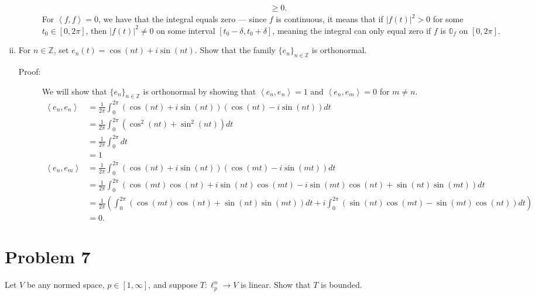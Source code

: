 \documentclass[8pt]{extarticle}
\newcommand{\Z}{\mathbb{Z}}
\newcommand{\iprod}[2]{\left\langle #1,#2\right\rangle}
\begin{document}
\begin{enumerate}[(i)]
\begin{description}
\begin{align*}
                         &\geq 0.
          \end{align*}
          For $\iprod{f}{f} = 0$, we have that the integral equals zero --- since $f$ is continuous, it means that if $|f(t)|^2 > 0$ for some $t_0\in [0,2\pi]$, then $|f(t)|^2 \neq 0$ on some interval $[t_0-\delta,t_0+\delta]$, meaning the integral can only equal zero if $f$ is $\mathbb{0}_f$ on $[0,2\pi]$.
      \end{description}
    \item For $n\in\Z$, set $e_n(t) = \cos(nt) + i\sin(nt)$. Show that the family $\{e_n\}_{n\in\Z}$ is orthonormal.
      \begin{description}
        \item[Proof:] We will show that $\{e_n\}_{n\in\Z}$ is orthonormal by showing that $\iprod{e_n}{e_n} = 1$ and $\iprod{e_n}{e_m} = 0$ for $m\neq n$.
          \begin{align*}
            \iprod{e_n}{e_n} &= \frac{1}{2\pi}\int_{0}^{2\pi}(\cos(nt) + i\sin(nt))(\cos(nt)-i\sin(nt))dt\\
                             &= \frac{1}{2\pi}\int_{0}^{2\pi}\left(\cos^{2}(nt) + \sin^{2}(nt)\right)dt\\
                             &= \frac{1}{2\pi}\int_{0}^{2\pi}dt\\
                             &= 1\\
            \iprod{e_n}{e_m} &= \frac{1}{2\pi}\int_{0}^{2\pi}(\cos(nt) + i\sin(nt))(\cos(mt) - i\sin(mt))dt\\
                             &= \frac{1}{2\pi}\int_{0}^{2\pi}\left(\cos(mt)\cos(nt) + i\sin(nt)\cos(mt) - i\sin(mt)\cos(nt) + \sin(nt)\sin(mt)\right)dt\\
                             &= \frac{1}{2\pi}\left(\int_{0}^{2\pi}(\cos(mt)\cos(nt) + \sin(nt)\sin(mt))dt + i\int_{0}^{2\pi}(\sin(nt)\cos(mt) - \sin(mt)\cos(nt))dt\right)\\
                             &= 0.
          \end{align*}
      \end{description}
  \end{enumerate}
  \section{Problem 7}%
  Let $V$ be any normed space, $p\in[1,\infty]$, and suppose $T:\ell_{p}^{n}\rightarrow V$ is linear. Show that $T$ is bounded.
\end{document}
